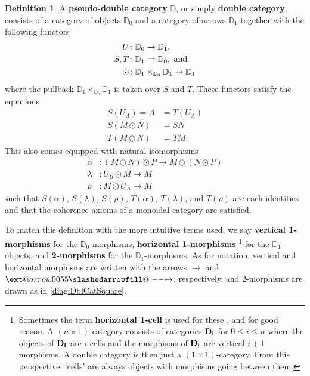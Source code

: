 \documentclass[11pt]{amsart}
\makeatletter
\newcommand{\dblcat}[1]{\mathbb{#1}}
\renewcommand{\t}[1]{\textup{#1}}
\newcommand{\from}{\colon}
\def\slashedarrowfill@#1#2#3#4#5{%
	$\m@th\thickmuskip0mu\medmuskip\thickmuskip\thinmuskip\thickmuskip
	\relax#5#1\mkern-7mu%
	\cleaders\hbox{$#5\mkern-2mu#2\mkern-2mu$}\hfill
	\mathclap{#3}\mathclap{#2}%
	\cleaders\hbox{$#5\mkern-2mu#2\mkern-2mu$}\hfill
	\mkern-7mu#4$%
}
\def\rightslashedarrowfill@{%
	\slashedarrowfill@\relbar\relbar\mapstochar\rightarrow}
\newcommand{\xslashedrightarrow}[2][]{%
	\ext@arrow 0055{\rightslashedarrowfill@}{#1}{#2}}
\newcommand{\hto}{\xslashedrightarrow{}}
\theoremstyle{remark}
\theoremstyle{definition}
\newtheorem{defn}[thm]{Definition}
\makeatother
\begin{document}
%
\begin{defn}
	\label{def:DoubleCategory}
	A \textbf{pseudo-double category} $\dblcat{D}$, 
	or simply \textbf{double category}, consists of 
	a category of objects $\dblcat{D}_{0}$ and 
	a category of arrows $\dblcat{D}_{1}$ together
	with the following functors
	\begin{equation*}
		\begin{split}
			U & 
				\from \dblcat{D}_{0} \to \dblcat{D}_{1}, \\
			S,T & 
				\from \dblcat{D}_{1} \rightrightarrows \dblcat{D}_{0}, \t{ and} \\
			\odot & 
				\from \dblcat{D}_{1} \times_{\dblcat{D}_{0}} \dblcat{D}_{1} 
					\to \dblcat{D}_{1}
		\end{split}
	\end{equation*}
	where the pullback 
		$\dblcat{D}_{1} \times_{\dblcat{D}_{0}} \dblcat{D}_{1}$ 
	is taken over $S$ and $T$.  
	These functors satisfy the equations
	\begin{equation*}
		\begin{split}
			S(U_{A}) = A & = T(U_{A}) \\
			S(M \odot N) & = SN \\
			T(M \odot N) & = TM. 
	\end{split}
	\end{equation*}
	This also comes equipped with natural isomorphisms
	\begin{equation*}
		\begin{split}
		\alpha & \from (M \odot N) \odot P \to M \odot (N \odot P)\\
		\lambda & \from U_{B} \odot M \to M\\
		\rho & \from M \odot U_{A} \to M
	\end{split}
	\end{equation*}
	such that 
		$S(\alpha)$, 
		$S(\lambda)$, 
		$S(\rho)$, 
		$T(\alpha)$, 
		$T(\lambda)$, and 
		$T(\rho)$ 
	are each identities and that 
	the coherence axioms of a monoidal category are satisfied. 
	
	To match this definition with the more intuitive terms used, we say
	\textbf{vertical 1-morphisms} for the $\dblcat{D}_{0}$-morphisms,
	\textbf{horizontal 1-morphisms} \footnote{Sometimes the term \textbf{horizontal 1-cell} is used for these \cite{Shul}, and for good reason. A $(n \times 1)$-category consists of categories $\bold{D_i}$ for $0 \leq i \leq n$ where the objects of $\bold{D_i}$ are $i$-cells and the morphisms of $\bold{D_i}$ are vertical $i+1$-morphisms. A double category is then just a $(1 \times 1)$-category. From this perspective, `cells' are always objects with morphisms going between them.} for the $\dblcat{D}_{1}$-objects, and
	\textbf{2-morphisms} for the $\dblcat{D}_{1}$-morphisms. 
	As for notation, vertical and horizontal morphisms 
	are written with the arrows $\to$ and $\hto$, respectively, and 
	2-morphisms are drawn as in 
		\eqref{diag:DblCatSquare}.
\end{defn}
\end{document}
